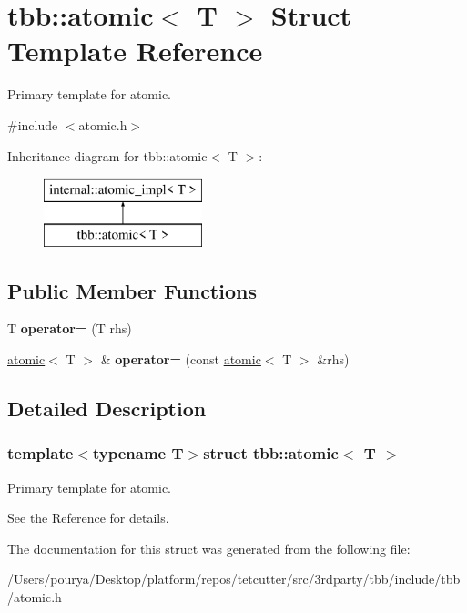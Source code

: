 \hypertarget{structtbb_1_1atomic}{}\section{tbb\+:\+:atomic$<$ T $>$ Struct Template Reference}
\label{structtbb_1_1atomic}


Primary template for atomic.  




{\ttfamily \#include $<$atomic.\+h$>$}

Inheritance diagram for tbb\+:\+:atomic$<$ T $>$\+:\begin{figure}[H]
\begin{center}
\leavevmode
\includegraphics[height=2.000000cm]{structtbb_1_1atomic}
\end{center}
\end{figure}
\subsection*{Public Member Functions}
\begin{DoxyCompactItemize}
\item 
\hypertarget{structtbb_1_1atomic_a5942feb81281f810edddc61a48dd7a39}{}T {\bfseries operator=} (T rhs)\label{structtbb_1_1atomic_a5942feb81281f810edddc61a48dd7a39}

\item 
\hypertarget{structtbb_1_1atomic_a7d65b6cae3bd11c79a8e51e25055be52}{}\hyperlink{structtbb_1_1atomic}{atomic}$<$ T $>$ \& {\bfseries operator=} (const \hyperlink{structtbb_1_1atomic}{atomic}$<$ T $>$ \&rhs)\label{structtbb_1_1atomic_a7d65b6cae3bd11c79a8e51e25055be52}

\end{DoxyCompactItemize}


\subsection{Detailed Description}
\subsubsection*{template$<$typename T$>$struct tbb\+::atomic$<$ T $>$}

Primary template for atomic. 

See the Reference for details. 

The documentation for this struct was generated from the following file\+:\begin{DoxyCompactItemize}
\item 
/\+Users/pourya/\+Desktop/platform/repos/tetcutter/src/3rdparty/tbb/include/tbb/atomic.\+h\end{DoxyCompactItemize}
